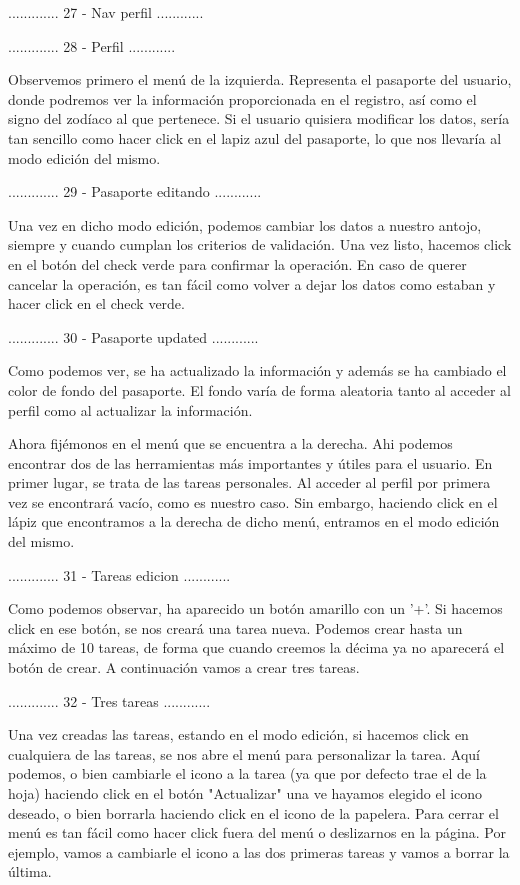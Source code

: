 ............. 27 - Nav perfil ............

............. 28 - Perfil ............

Observemos primero el menú de la izquierda. Representa el pasaporte del usuario, donde podremos
ver la información proporcionada en el registro, así como el signo del zodíaco al que 
pertenece. Si el usuario quisiera modificar los datos, sería tan sencillo como hacer click
en el lapiz azul del pasaporte, lo que nos llevaría al modo edición del mismo.

............. 29 - Pasaporte editando ............

Una vez en dicho modo edición, podemos cambiar los datos a nuestro antojo, siempre y cuando
cumplan los criterios de validación. Una vez listo, hacemos click en el botón del check
verde para confirmar la operación. En caso de querer cancelar la operación, es tan fácil como volver
a dejar los datos como estaban y hacer click en el check verde.

............. 30 - Pasaporte updated ............

Como podemos ver, se ha actualizado la información y además se ha cambiado el color de fondo
del pasaporte. El fondo varía de forma aleatoria tanto al acceder al perfil como al actualizar
la información.

Ahora fijémonos en el menú que se encuentra a la derecha. Ahi podemos encontrar dos de las 
herramientas más importantes y útiles para el usuario. En primer lugar, se trata de las
tareas personales. Al acceder al perfil por primera vez se encontrará vacío, como es nuestro
caso. Sin embargo, haciendo click en el lápiz que encontramos a la derecha de dicho menú, entramos
en el modo edición del mismo.

............. 31 - Tareas edicion ............

Como podemos observar, ha aparecido un botón amarillo con un '+'. Si hacemos click en ese
botón, se nos creará una tarea nueva. Podemos crear hasta un máximo de 10 tareas, de forma
que cuando creemos la décima ya no aparecerá el botón de crear. A continuación vamos a crear 
tres tareas.

............. 32 - Tres tareas ............

Una vez creadas las tareas, estando en el modo edición, si hacemos click en cualquiera de las
tareas, se nos abre el menú para personalizar la tarea. Aquí podemos, o bien cambiarle el icono
a la tarea (ya que por defecto trae el de la hoja) haciendo click en el botón "Actualizar" una ve
hayamos elegido el icono deseado, o bien borrarla haciendo click en el icono de la papelera.
Para cerrar el menú es tan fácil como hacer click fuera del menú o deslizarnos en la página.
Por ejemplo, vamos a cambiarle el icono a las dos primeras tareas y vamos a borrar la última.

